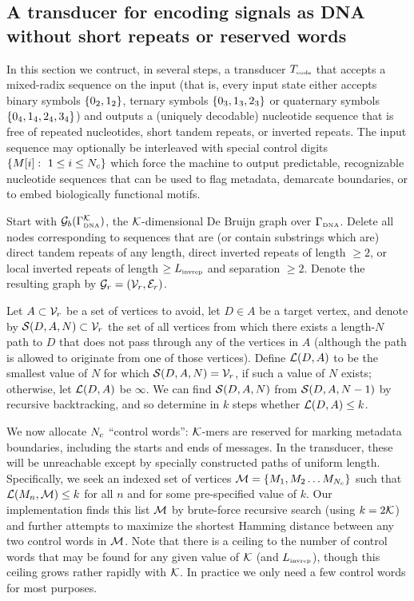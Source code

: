 \documentclass[english]{article}
\begin{document}
\subsection{A transducer for encoding signals as DNA without short repeats or reserved words}

In this section we contruct, in several steps, a transducer $T_{\mbox{\tiny code}}$
that accepts a mixed-radix sequence on the input
(that is, every input state either accepts binary symbols $\{ 0_2, 1_2 \}$,
ternary symbols $\{ 0_3, 1_3, 2_3 \}$ or
quaternary symbols $\{ 0_4, 1_4, 2_4, 3_4 \}$)
and outputs a (uniquely decodable) nucleotide sequence that is free of
repeated nucleotides, short tandem repeats, or inverted repeats.
The input sequence may optionally be interleaved with special control digits
$\{ M[{i}]:\ 1 \leq i \leq N_c \}$
which force the machine to output predictable, recognizable nucleotide sequences
that can be used to flag metadata, demarcate boundaries,
or to embed biologically functional motifs.

Start with ${\cal G}_b(\Gamma_{\mbox{\tiny DNA}}^{\cal K})$, the ${\cal K}$-dimensional De Bruijn graph over $\Gamma_{\mbox{\tiny DNA}}$.
Delete all nodes corresponding to sequences that are (or contain substrings which are)
direct tandem repeats of any length,
direct inverted repeats of length $\geq 2$,
or local inverted repeats of length $\geq L_{\mbox{\tiny invrep}}$ and separation $\geq 2$.
Denote the resulting graph by ${\cal G}_r = ({\cal V}_r,{\cal E}_r)$.

Let $A \subset {\cal V}_r$ be a set of vertices to avoid,
let $D \in A$ be a target vertex,
and denote by ${\cal S}(D,A,N) \subset {\cal V}_r$
the set of all vertices
from which there exists a length-$N$ path to $D$
that does not pass through any of the vertices in $A$
(although the path is allowed to originate from one of those vertices).
Define ${\cal L}(D,A)$ to be the smallest value of $N$ for which ${\cal S}(D,A,N) = {\cal V}_r$,
if such a value of $N$ exists; otherwise, let ${\cal L}(D,A)$ be $\infty$.
We can find ${\cal S}(D,A,N)$ from ${\cal S}(D,A,N-1)$ by recursive backtracking,
and so determine in $k$ steps whether ${\cal L}(D,A) \leq k$.

We now allocate $N_c$ ``control words'': ${\cal K}$-mers are reserved for marking metadata boundaries,
including the starts and ends of messages.
In the transducer, these will be unreachable except by specially constructed paths of uniform length.
Specifically, we seek an indexed set of vertices
${\cal M} = \{ M_1, M_2 \ldots M_{N_c} \}$
such that ${\cal L}(M_n,{\cal M}) \leq k$ for all $n$
and for some pre-specified value of $k$.
Our implementation finds this list ${\cal M}$ by brute-force recursive search
(using $k = 2{\cal K}$)
and further attempts to maximize the shortest Hamming distance between any two control words in ${\cal M}$.
Note that there is a ceiling to the number of control words that may be found
for any given value of ${\cal K}$ (and $L_{\mbox{\tiny invrep}}$),
though this ceiling grows rather rapidly with ${\cal K}$.
In practice we only need a few control words for most purposes.
\end{document}
